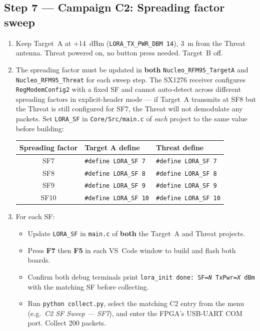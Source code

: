 \documentclass[11pt,letterpaper]{article}
\begin{document}
\subsection{Step 7 --- Campaign C2: Spreading factor sweep}
\begin{enumerate}[leftmargin=2em]
	\item Keep Target~A at +14~dBm (\texttt{LORA\_TX\_PWR\_DBM 14}), 3~m from the Threat antenna. Threat powered on, no button press needed. Target~B off.
	\item The spreading factor must be updated in \textbf{both} \texttt{Nucleo\_RFM95\_TargetA} and \texttt{Nucleo\_RFM95\_Threat} for each sweep step. The SX1276 receiver configures \texttt{RegModemConfig2} with a fixed SF and cannot auto-detect across different spreading factors in explicit-header mode --- if Target~A transmits at SF8 but the Threat is still configured for SF7, the Threat will not demodulate any packets. Set \texttt{LORA\_SF} in \texttt{Core/Src/main.c} of \emph{each} project to the same value before building:

	\begin{center}
	\renewcommand{\arraystretch}{1.2}
	\begin{tabular}{cll}
		\toprule
		\textbf{Spreading factor} & \textbf{Target A define} & \textbf{Threat define} \\
		\midrule
		SF7  & \texttt{\#define LORA\_SF  7}  & \texttt{\#define LORA\_SF  7} \\
		SF8  & \texttt{\#define LORA\_SF  8}  & \texttt{\#define LORA\_SF  8} \\
		SF9  & \texttt{\#define LORA\_SF  9}  & \texttt{\#define LORA\_SF  9} \\
		SF10 & \texttt{\#define LORA\_SF  10} & \texttt{\#define LORA\_SF  10} \\
		\bottomrule
	\end{tabular}
	\end{center}

	\item For each SF:
	\begin{itemize}[leftmargin=1.2em]
		\item Update \texttt{LORA\_SF} in \texttt{main.c} of \textbf{both} the Target~A and Threat projects.
		\item Press \textbf{F7} then \textbf{F5} in each VS~Code window to build and flash both boards.
		\item Confirm both debug terminals print \texttt{lora\_init done: SF=\textit{N} TxPwr=\textit{X} dBm} with the matching SF before collecting.
		\item Run \texttt{python collect.py}, select the matching C2 entry from the menu (e.g.\ \emph{C2 SF Sweep --- SF7}), and enter the FPGA's USB-UART COM port. Collect 200 packets.
	\end{itemize}
\end{enumerate}
\end{document}
